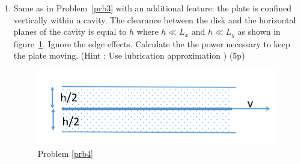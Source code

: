 \documentclass[12pt,a4paper]{article}
\begin{document}
\begin{enumerate}
\item \label{prb4} Same as in Problem~\ref{prb3} with an additional feature:
  the plate is confined vertically within a cavity. The clearance between the
  disk and the horizontal planes of the cavity is equal to $h$ where $h \ll L_x $
  and $h \ll L_y$  as shown in figure~\ref{pipe_disc}.
   Ignore the edge effects. 
  Calculate  the the power necessary to keep the plate moving. 
    (Hint : Use lubrication approximation )  (5p)

  \begin{figure}
    \includegraphics[width=0.4\linewidth]{plate.png}
    \caption{\label{pipe_disc} Problem \ref{prb4} }
  \end{figure}

\end{enumerate}
\end{document}
